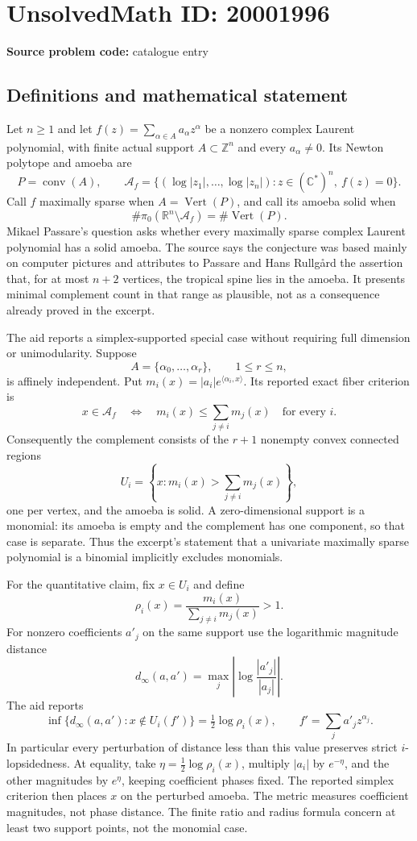 \documentclass[11pt]{article}
\newcommand{\Z}{\mathbb{Z}}
\newcommand{\R}{\mathbb{R}}
\newcommand{\C}{\mathbb{C}}
\begin{document}
\section*{UnsolvedMath ID: 20001996}
\textbf{Source problem code:} catalogue entry
\subsection{Definitions and mathematical statement}
Let \(n\ge1\) and let \(f(z)=\sum_{\alpha\in A}a_\alpha z^\alpha\) be a nonzero complex Laurent polynomial, with finite actual support \(A\subset\Z^n\) and every \(a_\alpha\ne0\). Its Newton polytope and amoeba are
\[
 P=\operatorname{conv}(A),\qquad
 \mathcal A_f=\{(\log|z_1|,\ldots,\log|z_n|):z\in(\C^*)^n,\ f(z)=0\}.
\]
Call \(f\) maximally sparse when \(A=\operatorname{Vert}(P)\), and call its amoeba solid when
\[
 \#\pi_0(\R^n\setminus\mathcal A_f)=\#\operatorname{Vert}(P).
\]
Mikael Passare's question asks whether every maximally sparse complex Laurent polynomial has a solid amoeba. The source says the conjecture was based mainly on computer pictures and attributes to Passare and Hans Rullgård the assertion that, for at most \(n+2\) vertices, the tropical spine lies in the amoeba. It presents minimal complement count in that range as plausible, not as a consequence already proved in the excerpt.

The aid reports a simplex-supported special case without requiring full dimension or unimodularity. Suppose
\[
 A=\{\alpha_0,\ldots,\alpha_r\},\qquad 1\le r\le n,
\]
is affinely independent. Put \(m_i(x)=|a_i|e^{\langle\alpha_i,x\rangle}\). Its reported exact fiber criterion is
\[
 x\in\mathcal A_f\quad\Longleftrightarrow\quad
 m_i(x)\le\sum_{j\ne i}m_j(x)\quad\text{for every }i.
\]
Consequently the complement consists of the \(r+1\) nonempty convex connected regions
\[
 U_i=\left\{x:m_i(x)>\sum_{j\ne i}m_j(x)\right\},
\]
one per vertex, and the amoeba is solid. A zero-dimensional support is a monomial: its amoeba is empty and the complement has one component, so that case is separate. Thus the excerpt's statement that a univariate maximally sparse polynomial is a binomial implicitly excludes monomials.

For the quantitative claim, fix \(x\in U_i\) and define
\[
 \rho_i(x)=\frac{m_i(x)}{\sum_{j\ne i}m_j(x)}>1.
\]
For nonzero coefficients \(a'_j\) on the same support use the logarithmic magnitude distance
\[
 d_\infty(a,a')=\max_j\left|\log\frac{|a'_j|}{|a_j|}\right|.
\]
The aid reports
\[
 \inf\{d_\infty(a,a'):x\notin U_i(f')\}
 =\tfrac12\log\rho_i(x),\qquad f'=\sum_j a'_jz^{\alpha_j}.
\]
In particular every perturbation of distance less than this value preserves strict \(i\)-lopsidedness. At equality, take \(\eta=\tfrac12\log\rho_i(x)\), multiply \(|a_i|\) by \(e^{-\eta}\), and the other magnitudes by \(e^\eta\), keeping coefficient phases fixed. The reported simplex criterion then places \(x\) on the perturbed amoeba. The metric measures coefficient magnitudes, not phase distance. The finite ratio and radius formula concern at least two support points, not the monomial case.
\end{document}
